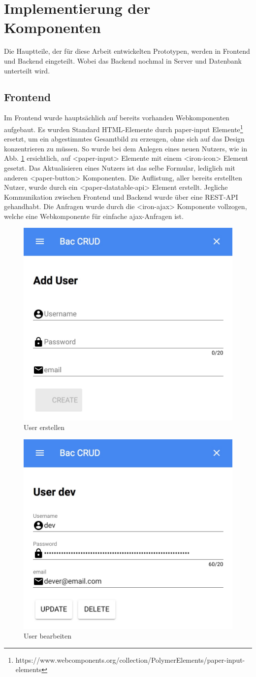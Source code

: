 \section{Implementierung der Komponenten}
Die Hauptteile, der für diese Arbeit entwickelten Prototypen, werden in Frontend und Backend eingeteilt. Wobei das Backend nochmal in Server und Datenbank unterteilt wird. 

\subsection{Frontend}
Im Frontend wurde hauptsächlich auf bereits vorhanden Webkomponenten aufgebaut. Es wurden Standard HTML-Elemente durch paper-input Elemente\footnote{https://www.webcomponents.org/collection/PolymerElements/paper-input-elements} ersetzt, um ein abgestimmtes Gesamtbild zu erzeugen, ohne sich auf das Design konzentrieren zu müssen. So wurde bei dem Anlegen eines neuen Nutzers, wie in Abb. \ref{fig:user_create} ersichtlich, auf <paper-input> Elemente mit einem <iron-icon> Element gesetzt. Das Aktualisieren eines Nutzers ist das selbe Formular, lediglich mit anderen <paper-button> Komponenten. Die Auflistung, aller bereits erstellten Nutzer, wurde durch ein <paper-datatable-api> Element erstellt. Jegliche Kommunikation zwischen Frontend und Backend wurde über eine REST-API gehandhabt. Die Anfragen wurde durch die <iron-ajax> Komponente vollzogen, welche eine Webkomponente für einfache ajax-Anfragen ist.
\begin{figure}
	\centering
	\includegraphics[width=0.5\linewidth]{images/user_create.jpeg}
	\caption{User erstellen}
	\label{fig:user_create}
\end{figure}

\begin{figure}
	\centering
	\includegraphics[width=0.5\linewidth]{images/user_update.jpeg}
	\caption{User bearbeiten}
	\label{fig:user_update}
\end{figure}

